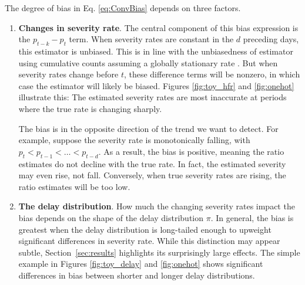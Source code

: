 \documentclass{article}
\newcommand{\ahcomment}[1]{{\color{red}[AH: #1]}}
\begin{document}
The degree of bias in Eq. \eqref{eq:ConvBias} depends on three factors.
\begin{enumerate}
    \item \textbf{Changes in severity rate}. The central component of this bias expression is the $p_{t-k}-p_t$ term. When severity rates are constant in the $d$ preceding days, this estimator is unbiased. This is in line with the unbiasedness of estimator using cumulative counts assuming a globally stationary rate \citep{nishiura}. But when severity rates change before $t$, these difference terms will be nonzero, in which case the estimator will likely be biased. 
Figures \ref{fig:toy_hfr} and \ref{fig:onehot} illustrate this: The estimated severity rates are most inaccurate at periods where the true rate is changing sharply. 

The bias is in the opposite direction of the trend we want to detect. For example, suppose the severity rate is monotonically falling, with $p_{t} < p_{t-1} < \ldots < p_{t-d}$. %
As a result, the bias is positive, meaning the ratio estimates do not decline with the true rate. In fact, the estimated severity may even rise, not fall. Conversely, when true severity rates are rising, the ratio estimates will be too low. %

    \item \textbf{The delay distribution}. How much the changing severity rates impact the bias depends on the shape of the delay distribution $\pi$. In general, the bias is greatest when the delay distribution is long-tailed enough to upweight significant differences in severity rate. While this distinction may appear subtle, Section~\ref{sec:results} highlights its surprisingly large effects. The simple example in Figures \ref{fig:toy_delay} and \ref{fig:onehot} shows significant differences in bias between shorter and longer delay distributions. 



\end{enumerate}
\end{document}
